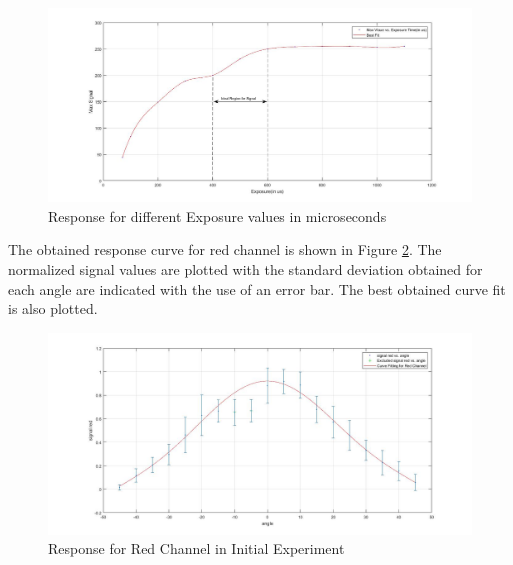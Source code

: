 \begin{figure}[ht]
\centering
\includegraphics[width = \textwidth]{pics/ExposureTests}
\caption{Response for different Exposure values in microseconds}
\label{fig:exp_acc_exp}
\end{figure}

The obtained response curve for red channel is shown in Figure \ref{fig:exp_acc_red_1}. The normalized signal values are plotted with the standard deviation obtained for each angle are indicated with the use of an error bar. The best obtained curve fit is also plotted.
 \begin{figure}[ht]
\centering
\includegraphics[width = \textwidth]{pics/RedChannel}
\caption{Response for Red Channel in Initial Experiment}
\label{fig:exp_acc_red_1}
\end{figure}

